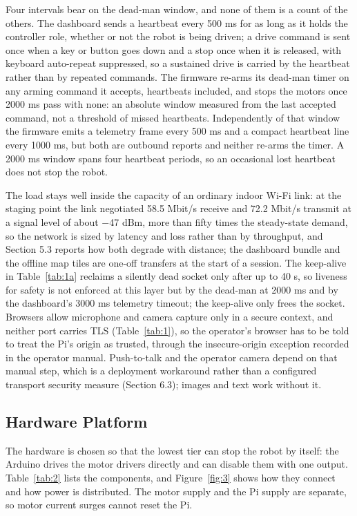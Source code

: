 Four intervals bear on the dead-man window, and none of them is a count of the others. The dashboard sends a heartbeat every 500 ms for as long as it holds the controller role, whether or not the robot is being driven; a drive command is sent once when a key or button goes down and a stop once when it is released, with keyboard auto-repeat suppressed, so a sustained drive is carried by the heartbeat rather than by repeated commands. The firmware re-arms its dead-man timer on any arming command it accepts, heartbeats included, and stops the motors once 2000 ms pass with none: an absolute window measured from the last accepted command, not a threshold of missed heartbeats. Independently of that window the firmware emits a telemetry frame every 500 ms and a compact heartbeat line every 1000 ms, but both are outbound reports and neither re-arms the timer. A 2000 ms window spans four heartbeat periods, so an occasional lost heartbeat does not stop the robot.

The load stays well inside the capacity of an ordinary indoor Wi-Fi link: at the staging point the link negotiated 58.5 Mbit/s receive and 72.2 Mbit/s transmit at a signal level of about $-$47 dBm, more than fifty times the steady-state demand, so the network is sized by latency and loss rather than by throughput, and Section 5.3 reports how both degrade with distance; the dashboard bundle and the offline map tiles are one-off transfers at the start of a session. The keep-alive in Table~\ref{tab:1a} reclaims a silently dead socket only after up to 40 s, so liveness for safety is not enforced at this layer but by the dead-man at 2000 ms and by the dashboard's 3000 ms telemetry timeout; the keep-alive only frees the socket. Browsers allow microphone and camera capture only in a secure context, and neither port carries TLS (Table~\ref{tab:1}), so the operator's browser has to be told to treat the Pi's origin as trusted, through the insecure-origin exception recorded in the operator manual. Push-to-talk and the operator camera depend on that manual step, which is a deployment workaround rather than a configured transport security measure (Section 6.3); images and text work without it.

\subsection{Hardware Platform}
\label{sec:hardware_platform}

The hardware is chosen so that the lowest tier can stop the robot by itself: the Arduino drives the motor drivers directly and can disable them with one output. Table~\ref{tab:2} lists the components, and Figure~\ref{fig:3} shows how they connect and how power is distributed. The motor supply and the Pi supply are separate, so motor current surges cannot reset the Pi.

